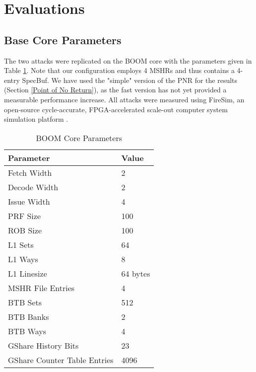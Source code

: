 \section{Evaluations} \label{Evaluations}

\subsection{Base Core Parameters}

The two attacks were replicated on the BOOM core with the parameters given
in Table \ref{tab:boom-core-params}. Note that our configuration employs 4 MSHRs and thus contains a 4-entry SpecBuf.
We have used the "simple" version of the PNR for the results (Section \ref{Point of No Return}), as the fast version has not yet provided a measurable performance increase.
All attacks were measured using FireSim, an open-source cycle-accurate, FPGA-accelerated scale-out computer system simulation platform \cite{b12}.

\begin{table}
\centering \caption{BOOM Core Parameters} \label{tab:boom-core-params}
\begin{tabular}{@{} *2l @{}} \toprule
    Parameter                    & Value \\ \midrule
    Fetch Width                  & 2 \\
    Decode Width                 & 2 \\
    Issue Width                  & 4 \\
    PRF Size                     & 100 \\
    ROB Size                     & 100 \\ \midrule
    L1 Sets                      & 64 \\
    L1 Ways                      & 8 \\
    L1 Linesize                  & 64 bytes \\
    MSHR File Entries            & 4 \\ \midrule
    BTB Sets                     & 512 \\
    BTB Banks                    & 2 \\
    BTB Ways                     & 4 \\ \midrule
    GShare History Bits          & 23 \\
    GShare Counter Table Entries & 4096 \\ \bottomrule
\end{tabular}
\end{table}

